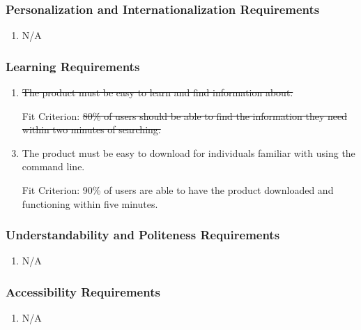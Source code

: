 \documentclass[12pt, titlepage]{article}
\begin{document}
\color{red}

\subsubsection{Personalization and Internationalization Requirements}

\begin{enumerate}[label=PIR\arabic*:, wide=0pt, leftmargin=*]
    \item N/A
\end{enumerate}

\color{black}

\subsubsection{Learning Requirements}
\begin{enumerate}[label=LR\arabic*:, wide=0pt, leftmargin=*]
    \item \st{The product must be easy to learn and find information about.}
    \item [Fit Criterion:] \st{80\% of users should be able to find the information they need within two minutes of searching.}
    \\
    \item The product must be easy to download for individuals familiar with using the command line.
    \item [Fit Criterion:] 90\% of users are able to have the product downloaded and functioning within five minutes.
\end{enumerate}

\color{red}

\subsubsection{Understandability and Politeness Requirements}

\begin{enumerate}[label=UPR\arabic*:, wide=0pt, leftmargin=*]
    \item N/A
\end{enumerate}

\subsubsection{Accessibility Requirements}

\begin{enumerate}[label=ASR\arabic*:, wide=0pt, leftmargin=*]
    \item N/A
\end{enumerate}
\end{document}
